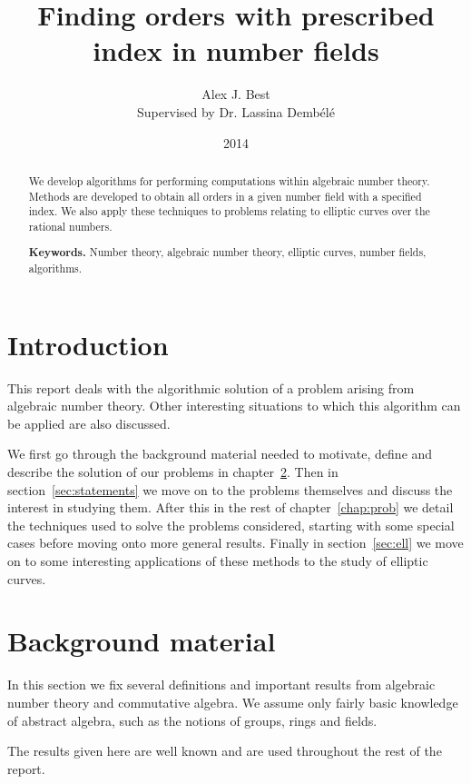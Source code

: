 \documentclass[a4paper,abstracton]{scrreprt}
\author{Alex J. Best \\Supervised by Dr. Lassina Demb\'el\'e}
\date{2014}
\title{Finding orders with prescribed index in number fields}
\theoremstyle{definition}
\begin{document}
\maketitle

\begin{abstract}
We develop algorithms for performing computations within algebraic number theory.
Methods are developed to obtain all orders in a given number field with a specified index.
We also apply these techniques to problems relating to elliptic curves over the rational numbers.

\smallskip
\noindent \textbf{Keywords.} Number theory, algebraic number theory, elliptic curves, number fields, algorithms.
\end{abstract}

\tableofcontents

\chapter{Introduction}
This report deals with the algorithmic solution of a problem arising from algebraic number theory. 
Other interesting situations to which this algorithm can be applied are also discussed.

We first go through the background material needed to motivate, define and describe the solution of our problems in chapter~\ref{chap:background}.
Then in section~\ref{sec:statements} we move on to the problems themselves and discuss the interest in studying them.
After this in the rest of chapter~\ref{chap:prob} we detail the techniques used to solve the problems considered, starting with some special cases before moving onto more general results.
Finally in section~\ref{sec:ell} we move on to some interesting applications of these methods to the study of elliptic curves.

\chapter{Background material}
\label{chap:background}

In this section we fix several definitions and important results from algebraic number theory and commutative algebra.
We assume only fairly basic knowledge of abstract algebra, such as the notions of groups, rings and fields.

The results given here are well known and are used throughout the rest of the report.
\end{document}
